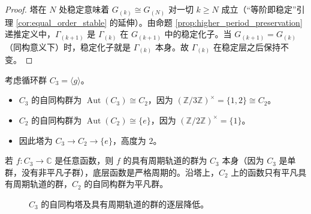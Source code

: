 \begin{proof}
塔在 $N$ 处稳定意味着 $G_{(k)}\cong G_{(N)}$ 对一切 $k\ge N$ 成立（“等阶即稳定”引理 \ref{cor:equal_order_stable} 的延伸）。由命题 \ref{prop:higher_period_preservation} 递推定义中，$\Gamma_{(k+1)}$ 是 $\Gamma_{(k)}$ 在 $G_{(k+1)}$ 中的稳定化子。当 $G_{(k+1)}=G_{(k)}$（同构意义下）时，稳定化子就是 $\Gamma_{(k)}$ 本身。故 $\Gamma_{(k)}$ 在稳定层之后保持不变。
\end{proof}

\begin{example}[循环群的自同构塔]\label{ex:cyclic_tower_period}
考虑循环群 $C_3 = \langle g \rangle$。
\begin{itemize}
    \item $C_3$ 的自同构群为 $\operatorname{Aut}(C_3) \cong C_2$，因为 $(\mathbb{Z}/3\mathbb{Z})^\times = \{1,2\} \cong C_2$。
    \item $C_2$ 的自同构群为 $\operatorname{Aut}(C_2) \cong \{e\}$，因为 $(\mathbb{Z}/2\mathbb{Z})^\times = \{1\}$。
    \item 因此塔为 $C_3 \to C_2 \to \{e\}$，高度为 $2$。
\end{itemize}
若 $f: C_3 \to \mathbb{C}$ 是任意函数，则 $f$ 的具有周期轨道的群为 $C_3$ 本身（因为 $C_3$ 是单群，没有非平凡子群），底层函数是严格周期的。沿塔上，$C_2$ 上的函数只有平凡具有周期轨道的群，$C_2$ 的自同构群为平凡群。
\end{example}

\begin{figure}[htbp]
\centering
{}
\caption{$C_3$ 的自同构塔及具有周期轨道的群的逐层降低。}
\label{fig:c3_tower_period}
\end{figure}

